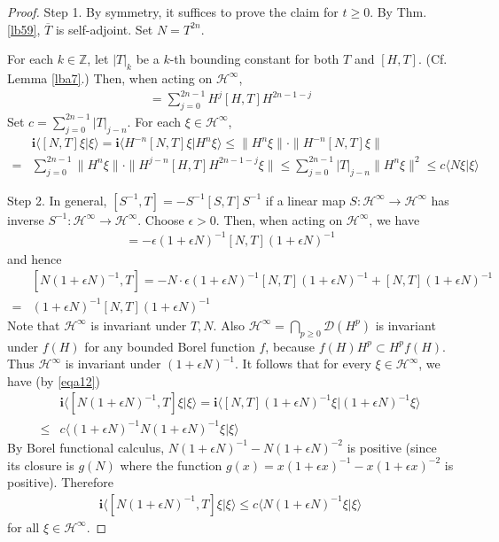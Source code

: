 \documentclass[12pt,b5paper,notitlepage]{article}
\theoremstyle{definition}
\theoremstyle{plain}
\newcommand{\mc}{\mathcal}
\newcommand{\ovl}{\overline}
\newcommand{\Dom}{\scr{D}}
\newcommand{\bk}[1]{\langle {#1}\rangle}
\newcommand{\scr}{\mathscr}
\newcommand{\im}{\mathbf{i}}
\newcommand{\Zbb}{\mathbb Z}
\numberwithin{equation}{section}
\begin{document}
\begin{proof}
Step 1. By symmetry, it suffices to prove the claim for $t\geq 0$. By Thm. \ref{lb59}, $\ovl T$ is self-adjoint. Set $N=T^{2n}$. 

For each $k\in\Zbb$, let $|T|_k$ be a $k$-th bounding constant for both $T$ and $[H,T]$. (Cf. Lemma \ref{lba7}.) Then, when acting on $\mc H^\infty$, 
\begin{align*}
	[N,T]=\sum_{j=0}^{2n-1}H^j[H,T]H^{2n-1-j}
\end{align*}
Set $c=\sum_{j=0}^{2n-1}|T|_{j-n}$. For each $\xi\in\mc H^\infty$,  
\begin{align*}
	&\im \bk{[N,T]\xi|\xi}=\im \bk{H^{-n}[N,T]\xi|H^n\xi}\leq \lVert H^n\xi \lVert\cdot \lVert H^{-n}[N,T]\xi \lVert\\
	=&\sum_{j=0}^{2n-1}	\lVert H^n\xi \lVert\cdot\lVert H^{j-n}[H,T]H^{2n-1-j}\xi \lVert\leq \sum_{j=0}^{2n-1}	|T|_{j-n}	\lVert H^n\xi \lVert^2	\leq c\bk{N\xi|\xi}\tag{a}\label{eqa12}
\end{align*}


Step 2. In general,  $[S^{-1},T]=-S^{-1}[S,T]S^{-1}$ if a linear map $S:\mc H^\infty\rightarrow\mc H^\infty$  has inverse $S^{-1}:\mc H^\infty\rightarrow\mc H^\infty$. Choose $\epsilon>0$. Then, when acting on $\mc H^\infty$, we have
\begin{align*}
	[(1+\epsilon N)^{-1},T]=-\epsilon (1+\epsilon N)^{-1}[N,T](1+\epsilon N)^{-1}
\end{align*}
and hence
\begin{align*}
	&[N(1+\epsilon N)^{-1},T]=-N\cdot \epsilon (1+\epsilon N)^{-1}[N,T](1+\epsilon N)^{-1}+[N,T](1+\epsilon N)^{-1}\\
	=&	(1+\epsilon N)^{-1}[N,T](1+\epsilon N)^{-1}
\end{align*}
Note that $\mc H^\infty$ is invariant under $T,N$. Also $\mc H^\infty=\bigcap_{p\geq0}\Dom(H^p)$ is invariant under $f(H)$ for any bounded Borel function $f$, because $f(H)H^p\subset H^pf(H)$. Thus $\mc H^\infty$ is invariant under $(1+\epsilon N)^{-1}$. It follows that for every $\xi\in\mc H^\infty$, we have (by \eqref{eqa12})
\begin{align*}
&\im\bk{[N(1+\epsilon N)^{-1},T]\xi|\xi}=\im\bk{[N,T](1+\epsilon N)^{-1}\xi|(1+\epsilon N)^{-1}\xi}\\
\leq &c\bk{(1+\epsilon N)^{-1}N(1+\epsilon N)^{-1}\xi|\xi}
\end{align*}
By Borel functional calculus, $N(1+\epsilon N)^{-1}-N(1+\epsilon N)^{-2}$ is positive (since its closure is $g(N)$ where the function $g(x)=x(1+\epsilon x)^{-1}-x(1+\epsilon x)^{-2}$ is positive). Therefore
\begin{align*}
\im\bk{[N(1+\epsilon N)^{-1},T]\xi|\xi}\leq 	c\bk{N(1+\epsilon N)^{-1}\xi|\xi}\tag{b}\label{eqa13}
\end{align*}
for all $\xi\in\mc H^\infty$.


\end{proof}
\end{document}
